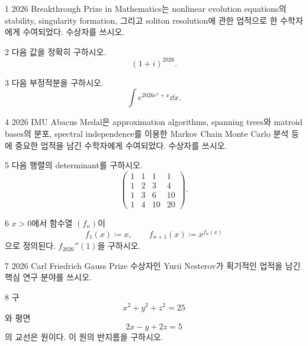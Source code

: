 \documentclass[11pt,oneside]{article}
\begin{document}

\begin{problem}{1}
2026 Breakthrough Prize in Mathematics는 nonlinear evolution equations의 stability, singularity formation, 그리고 soliton resolution에 관한 업적으로 한 수학자에게 수여되었다. 수상자를 쓰시오.
\end{problem}

\begin{problem}{2}
다음 값을 정확히 구하시오.
\[
    (1+i)^{2026}.
\]
\end{problem}

\begin{problem}{3}
다음 부정적분을 구하시오.
\[
    \int e^{2026e^x+x}\dd x.
\]
\end{problem}

\begin{problem}{4}
2026 IMU Abacus Medal은 approximation algorithms, spanning trees와 matroid bases의 분포, spectral independence를 이용한 Markov Chain Monte Carlo 분석 등에 중요한 업적을 남긴 수학자에게 수여되었다. 수상자를 쓰시오.
\end{problem}

\begin{problem}{5}
다음 행렬의 determinant를 구하시오.
\[
    \begin{pmatrix}
        1&1&1&1\\
        1&2&3&4\\
        1&3&6&10\\
        1&4&10&20
    \end{pmatrix}.
\]
\end{problem}

\begin{problem}{6}
$x>0$에서 함수열 $(f_n)$이
\[
    f_1(x)\coloneqq x,
    \qquad
    f_{n+1}(x)\coloneqq x^{f_n(x)}
\]
으로 정의된다. $f_{2026}''(1)$을 구하시오.
\end{problem}

\begin{problem}{7}
2026 Carl Friedrich Gauss Prize 수상자인 Yurii Nesterov가 획기적인 업적을 남긴 핵심 연구 분야를 쓰시오.
\end{problem}

\begin{problem}{8}
구
\[
    x^2+y^2+z^2=25
\]
와 평면
\[
    2x-y+2z=5
\]
의 교선은 원이다. 이 원의 반지름을 구하시오.
\end{problem}
\end{document}
